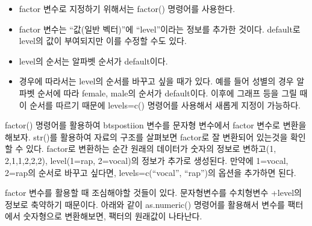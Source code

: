 \documentclass[
]{book}
\newenvironment{Shaded}{\begin{snugshade}}{\end{snugshade}}
\newcommand{\AttributeTok}[1]{\textcolor[rgb]{0.77,0.63,0.00}{#1}}
\newcommand{\DocumentationTok}[1]{\textcolor[rgb]{0.56,0.35,0.01}{\textbf{\textit{#1}}}}
\newcommand{\FunctionTok}[1]{\textcolor[rgb]{0.00,0.00,0.00}{#1}}
\newcommand{\NormalTok}[1]{#1}
\newcommand{\OtherTok}[1]{\textcolor[rgb]{0.56,0.35,0.01}{#1}}
\newcommand{\SpecialCharTok}[1]{\textcolor[rgb]{0.00,0.00,0.00}{#1}}
\newcommand{\StringTok}[1]{\textcolor[rgb]{0.31,0.60,0.02}{#1}}
\providecommand{\tightlist}{%
  \setlength{\itemsep}{0pt}\setlength{\parskip}{0pt}}
\theoremstyle{definition}
\theoremstyle{definition}
\theoremstyle{definition}
\theoremstyle{definition}
\theoremstyle{remark}
\begin{document}
\begin{itemize}
\tightlist
\item
  factor 변수로 지정하기 위해서는 factor() 명령어를 사용한다.
\item
  factor 변수는 ``값(일반 벡터)''에 ``level''이라는 정보를 추가한 것이다. default로 level의 값이 부여되지만 이를 수정할 수도 있다.
\item
  level의 순서는 알파벳 순서가 default이다.
\item
  경우에 따라서는 level의 순서를 바꾸고 싶을 때가 있다. 예를 들어 성별의 경우 알파벳 순서에 따라 female, male의 순서가 default이다. 이후에 그래프 등을 그릴 때 이 순서를 따르기 때문에 levels=c() 명령어를 사용해서 새롭게 지정이 가능하다.
\end{itemize}

factor() 명령어를 활용하여 btspostiion 변수를 문자형 변수에서 factor 변수로 변환을 해보자. str()를 활용하여 자료의 구조를 살펴보면 factor로 잘 변환되어 있는것을 확인할 수 있다. factor로 변환하는 순간 원래의 데이터가 숫자의 정보로 변하고(1, 2,1,1,2,2,2), level(1=rap, 2=vocal)의 정보가 추가로 생성된다. 만약에 1=vocal, 2=rap의 순서로 바꾸고 싶다면, levels=c(``vocal'', ``rap'')의 옵션을 추가하면 된다.

\begin{Shaded}
\end{Shaded}

factor 변수를 활용할 때 조심해야할 것들이 있다. 문자형변수를 수치형변수 +level의 정보로 축약하기 때문이다. 아래와 같이 as.numeric() 명령어를 활용해서 변수를 팩터에서 숫자형으로 변환해보면, 팩터의 원래값이 나타난다.
\end{document}
